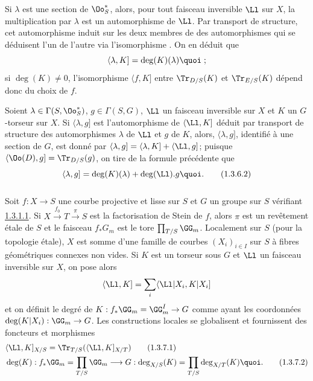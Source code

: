 Si $\lambda$ est une section de $\Oo^{\ast}_{S}$, alors, pour tout
faisceau inversible $\Ll$ sur $X$, la multiplication par
$\lambda$ est un automorphisme de $\Ll$. Par transport de
structure, cet automorphisme induit sur les deux membres de 
des automorphismes qui se déduisent l'un de l'autre via l'isomorphisme
. On en déduit que
$$
\langle \lambda, K]=\deg (K)(\lambda){\quoi}\;;
$$
si $\deg(K)\neq 0$, l'isomorphisme $\langle f,K]$ entre $\Tr_{D/S}(K)$ et
$\Tr_{E/S}(K)$ dépend donc du choix de $f$.

Soient $\lambda\in \Gamma(S,\Oo^{\ast}_{S})$, $g\in \Gamma(S,G)$,
$\Ll$ un faisceau inversible sur $X$ et $K$ un $G$-torseur sur
$X$. Si $\langle \lambda,g]$ est l'automorphisme de $\langle \Ll,K]$ déduit
par transport de structure des automorphismes $\lambda$ de
$\Ll$ et $g$ de $K$, alors, $\langle \lambda,g]$, identifié à une
section de $G$, est donné par
$\langle \lambda,g]=\langle \lambda,K]+\langle \Ll,g]$; puisque
$\langle \Oo(D),g]=\Tr_{D/S}(g)$, on tire de la formule précédente que
\begin{equation*}
\langle \lambda,g]=\deg(K)(\lambda)+\deg(\Ll).g{\quoi}.\tag{1.3.6.2}
\end{equation*}

\subsubsection{}
Soit $f:X\rightarrow S$ une courbe projective et lisse sur $S$ et $G$
un groupe sur $S$ vérifiant \hyperref[XVIII.par1.3.1.1]{1.3.1.1}. Si
$X\xrightarrow{f_{0}}T\xrightarrow{\pi}S$ est la factorisation de
Stein de $f$, alors $\pi$ est un revêtement étale de $S$ et le
faisceau $f_{\ast}G_{m}$ est le tore
$\prod_{T/S}\GG_{m}$. Localement sur $S$ (pour la topologie
étale), $X$ est somme d'une famille de courbes $(X_{i})_{i\in I}$ sur
$S$ à fibres géométriques connexes non vides. Si $K$ est un torseur
sous $G$ et $\Ll$ un faisceau inversible sur $X$, on pose
alors
$$
\langle \Ll,K]=\sum_{i}\langle \Ll|X_{i},K|X_{i}]
$$
et on définit le degré de
$K:f_{\ast}\GG_{m}=\GG^{I}_{m}\rightarrow G$ comme ayant
les coordonnées $\deg(K|X_{i}):\GG_{m}\rightarrow G$. Les
constructions locales se globalisent et fournissent\pageoriginale 
des foncteurs et morphismes
\begin{align*}
& \langle \Ll,K]_{X/S}=\Tr_{T/S}(\langle \Ll,K]_{X/T})\tag{1.3.7.1}\\
& \deg(K):f_{\ast}\GG_{m}=\prod_{T/S}\GG_{m}\longrightarrow G:\deg_{X/S}(K)=\prod_{T/S}\deg_{X/T}(K){\quoi}.\tag{1.3.7.2}
\end{align*}

